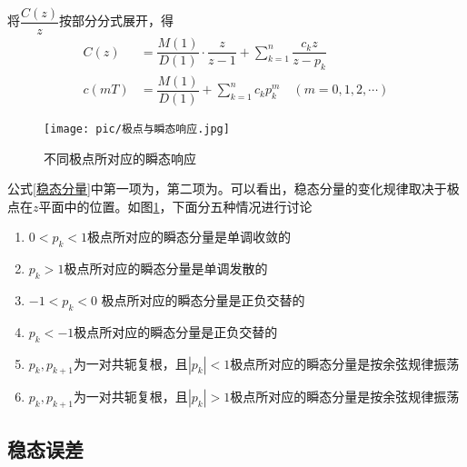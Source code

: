 将$\dfrac{C(z)}{z}$按部分分式展开，得
\begin{align}
	C(z) &= \dfrac{M(1)}{D(1)}\cdot\dfrac{z}{z-1} + \sum_{k=1}^{n} \dfrac{c_kz}{z - p_k}\\
	c(mT) &= \dfrac{M(1)}{D(1)} + \sum_{k=1}^{n}c_kp_k^m \quad (m = 0,1,2,\cdots)
	\label{稳态分量}
\end{align}
\begin{figure}[!htb]
	\centering
	\texttt{[image: pic/极点与瞬态响应.jpg]}
	\vspace*{-1.5em}
	\caption{不同极点所对应的瞬态响应}
	\label{极点与瞬态响应}
\end{figure} 
公式\eqref{稳态分量}中第一项为，第二项为。可以看出，稳态分量的变化规律取决于极点在$z$平面中的位置。如图\ref{极点与瞬态响应}，下面分五种情况进行讨论
\vspace*{-0.5em}
\begin{enumerate}[\hspace*{2em}(a) ]
	\item $0<p_k<1$\quad 极点所对应的瞬态分量是单调收敛的 \vspace*{-0.5em}
	\item $p_k>1$\quad 极点所对应的瞬态分量是单调发散的 \vspace*{-0.5em}
	\item $-1<p_k<0$ \quad 极点所对应的瞬态分量是正负交替的 \vspace*{-0.5em}
	\item $p_k<-1$\quad 极点所对应的瞬态分量是正负交替的 \vspace*{-0.5em}
	\item $p_k, p_{k+1}$为一对共轭复根，且$|p_k|<1$\quad 极点所对应的瞬态分量是按余弦规律振荡 \vspace*{-0.5em}
	\item $p_k, p_{k+1}$为一对共轭复根，且$|p_k|>1$\quad 极点所对应的瞬态分量是按余弦规律振荡 \vspace*{-0.5em}
\end{enumerate}

\subsection{稳态误差}

